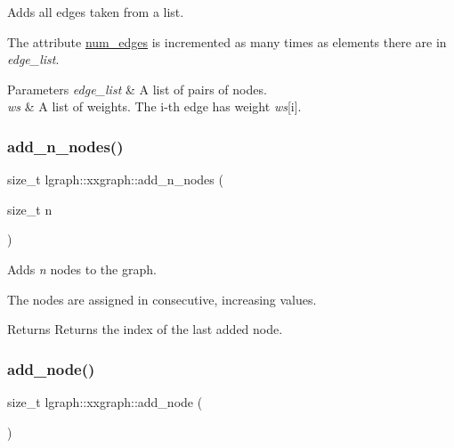 Adds all edges taken from a list. 

The attribute \hyperlink{classlgraph_1_1xxgraph_a6765a9a3be42f6e0f824635c593b35d7}{num\+\_\+edges} is incremented as many times as elements there are in {\itshape edge\+\_\+list}.


\begin{DoxyParams}{Parameters}
{\em edge\+\_\+list} & A list of pairs of nodes. \\
\hline
{\em ws} & A list of weights. The i-\/th edge has weight {\itshape ws}\mbox{[}i\mbox{]}. \\
\hline
\end{DoxyParams}
\mbox{\label{classlgraph_1_1xxgraph_a8dd24aa48d55dfceaa87e47c32ae914a}} 
\subsubsection{\texorpdfstring{add\+\_\+n\+\_\+nodes()}{add\_n\_nodes()}}
{\footnotesize\ttfamily size\+\_\+t lgraph\+::xxgraph\+::add\+\_\+n\+\_\+nodes (\begin{DoxyParamCaption}\item[{size\+\_\+t}]{n }\end{DoxyParamCaption})\hspace{0.3cm}{\ttfamily [inherited]}}



Adds {\itshape n} nodes to the graph. 

The nodes are assigned in consecutive, increasing values. \begin{DoxyReturn}{Returns}
Returns the index of the last added node. 
\end{DoxyReturn}
\mbox{\label{classlgraph_1_1xxgraph_a6cb21d5e52afbb438a3e6643998c40cf}} 
\subsubsection{\texorpdfstring{add\+\_\+node()}{add\_node()}}
{\footnotesize\ttfamily size\+\_\+t lgraph\+::xxgraph\+::add\+\_\+node (\begin{DoxyParamCaption}{ }\end{DoxyParamCaption})\hspace{0.3cm}{\ttfamily [inherited]}}



